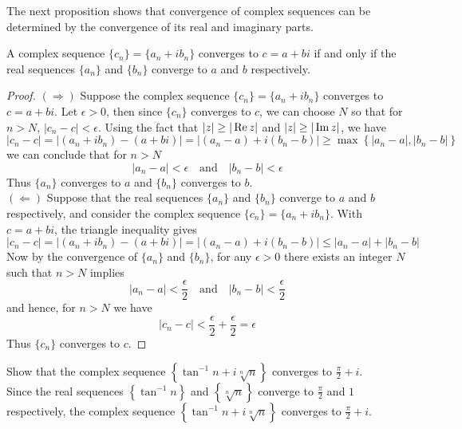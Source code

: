 \documentclass[handout]{ximera}
\begin{document}
The next proposition shows that convergence of complex sequences can be determined by the convergence of its real and imaginary parts.

\begin{proposition}
A complex sequence $\{c_n\} = \{a_n + ib_n\}$ converges to $c = a+bi$ if and only if the real 
sequences $\{a_n\}$ and $\{b_n\}$ converge to $a$ and $b$ respectively.
\end{proposition}
\begin{proof}
$\left(\Rightarrow\right)$ \; Suppose the complex sequence $\{c_n\} = \{a_n + ib_n\}$ converges to $c = a+bi$.
Let $\epsilon >0$, then since $\{c_n\}$ converges to $c$, we can choose $N$ so that for $n>N$, $|c_n - c| < \epsilon$.
Using the fact that $|z| \geq |\operatorname{Re} z|$ and $|z| \geq |\operatorname{Im} z|$, we have 
\[
|c_n - c| = |(a_n + ib_n) - (a+bi)| = |(a_n -a) + i(b_n -b)| \geq \max\left\{|a_n-a|, |b_n -b|\right\}
\]
we can conclude that for $n>N$
\[
|a_n-a| < \epsilon \quad \text{and} \quad  |b_n -b| < \epsilon
\]
Thus $\{a_n\}$ converges to $a$ and $\{b_n\}$ converges to $b$.\\
$\left(\Leftarrow\right)$ Suppose that the real sequences $\{a_n\}$ and $\{b_n\}$ converge to $a$ and $b$ respectively, 
and consider the complex sequence $\{c_n\} = \{a_n + ib_n\}$. With $c = a+bi$, the triangle inequality gives
\[
|c_n - c| = |(a_n + ib_n) - (a+bi)| = |(a_n -a) + i(b_n -b)| \leq |a_n-a|+ |b_n -b|
\]
Now by the convergence of $\{a_n\}$ and $\{b_n\}$, for any $\epsilon >0$ there exists an integer $N$ such that $n>N$ implies
\[
|a_n-a| < \frac{\epsilon}{2} \quad \text{and} \quad  |b_n -b| < \frac{\epsilon}{2}
\]
and hence, for $n>N$ we have
\[
|c_n-c| < \frac{\epsilon}{2}+\frac{\epsilon}{2}= \epsilon 
\]
Thus $\{c_n\}$ converges to $c$.
\end{proof}

\begin{example}
Show that the complex sequence $\displaystyle \left\{\tan^{-1} n + i\sqrt[n]n\right\}$ converges to $\displaystyle \frac{\pi}{2} + i$.\\
Since the real sequences $\displaystyle \left\{\tan^{-1} n\right\}$ and $\displaystyle \left\{\sqrt[n]n\right\}$ converge to 
$\displaystyle \frac{\pi}{2}$ and $1$ respectively, the complex sequence 
$\displaystyle \left\{\tan^{-1} n + i\sqrt[n]n\right\}$ converges to $\displaystyle \frac{\pi}{2} + i$.
\end{example}
\end{document}
